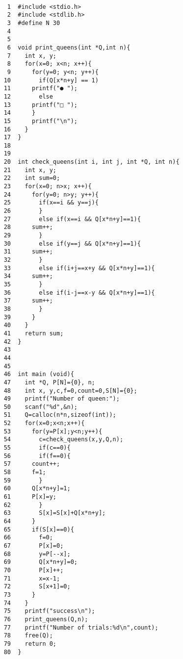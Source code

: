 \documentclass{jsarticle}
\begin{document}
\begin{lstlisting}[basicstyle=\ttfamily\footnotesize, frame=single]

     1	#include <stdio.h>
     2	#include <stdlib.h>
     3	#define N 30
     4	
     5	
     6	void print_queens(int *Q,int n){
     7	  int x, y;
     8	  for(x=0; x<n; x++){
     9	    for(y=0; y<n; y++){
    10	      if(Q[x*n+y] == 1)
    11		printf("● ");
    12	      else
    13		printf("□ ");
    14	    }
    15	    printf("\n");
    16	  }
    17	}
    18	
    19	
    20	int check_queens(int i, int j, int *Q, int n){
    21	  int x, y;
    22	  int sum=0;
    23	  for(x=0; n>x; x++){
    24	    for(y=0; n>y; y++){
    25	      if(x==i && y==j){
    26	      }
    27	      else if(x==i && Q[x*n+y]==1){
    28		sum++;
    29	      }
    30	      else if(y==j && Q[x*n+y]==1){
    31		sum++;
    32	      }
    33	      else if(i+j==x+y && Q[x*n+y]==1){
    34		sum++;
    35	      }
    36	      else if(i-j==x-y && Q[x*n+y]==1){
    37		sum++;
    38	      }
    39	    }
    40	  }
    41	  return sum;
    42	}
    43	
    44	
    45	
    46	int main (void){
    47	  int *Q, P[N]={0}, n;
    48	  int x, y,c,f=0,count=0,S[N]={0};
    49	  printf("Number of queen:");
    50	  scanf("%d",&n);
    51	  Q=calloc(n*n,sizeof(int));
    52	  for(x=0;x<n;x++){
    53	    for(y=P[x];y<n;y++){
    54	      c=check_queens(x,y,Q,n);
    55	      if(c==0){
    56	      if(f==0){
    57		count++;
    58		f=1;
    59	      }
    60		Q[x*n+y]=1;
    61		P[x]=y;
    62	      }
    63	      S[x]=S[x]+Q[x*n+y];
    64	    }
    65	    if(S[x]==0){
    66	      f=0;
    67	      P[x]=0;
    68	      y=P[--x];
    69	      Q[x*n+y]=0;
    70	      P[x]++;
    71	      x=x-1;
    72	      S[x+1]=0;
    73	    }
    74	  }
    75	  printf("success\n");
    76	  print_queens(Q,n);
    77	  printf("Number of trials:%d\n",count);
    78	  free(Q);
    79	  return 0;
    80	}


 \end{lstlisting}
\end{document}
